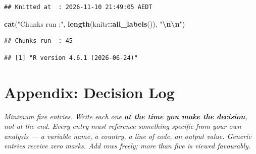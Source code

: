 \documentclass[
]{article}
\newenvironment{Shaded}{\begin{snugshade}}{\end{snugshade}}
\newcommand{\FunctionTok}[1]{\textcolor[rgb]{0.13,0.29,0.53}{\textbf{#1}}}
\newcommand{\NormalTok}[1]{#1}
\newcommand{\SpecialCharTok}[1]{\textcolor[rgb]{0.81,0.36,0.00}{\textbf{#1}}}
\newcommand{\StringTok}[1]{\textcolor[rgb]{0.31,0.60,0.02}{#1}}
\begin{document}
\begin{verbatim}
## Knitted at  : 2026-11-10 21:49:05 AEDT
\end{verbatim}

\begin{Shaded}
\begin{Highlighting}[]
\FunctionTok{cat}\NormalTok{(}\StringTok{"Chunks run  :"}\NormalTok{, }\FunctionTok{length}\NormalTok{(knitr}\SpecialCharTok{::}\FunctionTok{all\_labels}\NormalTok{()), }\StringTok{"}\SpecialCharTok{\textbackslash{}n\textbackslash{}n}\StringTok{"}\NormalTok{)}
\end{Highlighting}
\end{Shaded}

\begin{verbatim}
## Chunks run  : 45
\end{verbatim}

\begin{Shaded}
\end{Shaded}

\begin{verbatim}
## [1] "R version 4.6.1 (2026-06-24)"
\end{verbatim}

\newpage

\section{Appendix: Decision Log}\label{appendix-decision-log}

\emph{Minimum five entries. Write each one \textbf{at the time you make
the decision}, not at the end. Every entry must reference something
specific from your own analysis --- a variable name, a country, a line
of code, an output value. Generic entries receive zero marks. Add rows
freely; more than five is viewed favourably.}
\end{document}
